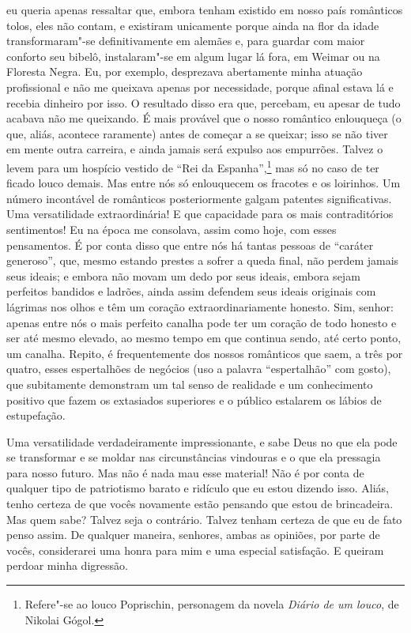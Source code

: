 eu queria apenas ressaltar que, embora tenham existido em nosso país românticos
tolos, eles não contam, e existiram unicamente porque ainda na flor da idade
transformaram"-se definitivamente em alemães e, para guardar com maior conforto
seu bibelô, instalaram"-se em algum lugar lá fora, em Weimar ou na Floresta
Negra. Eu, por exemplo, desprezava abertamente minha atuação profissional e não
me queixava apenas por necessidade, porque afinal estava lá e recebia dinheiro
por isso. O resultado disso era que, percebam, eu apesar de tudo acabava não me
queixando. É mais provável que o nosso romântico enlouqueça (o que, aliás,
acontece raramente) antes de começar a se queixar; isso se não tiver em mente
outra carreira, e ainda jamais será expulso aos empurrões. Talvez o levem para
um hospício vestido de “Rei da Espanha”,\footnote{ Refere"-se ao louco
Poprischin, personagem da novela \textit{Diário de um louco}, de Nikolai
Gógol.} mas só no caso de ter ficado louco demais. Mas entre nós só enlouquecem
os fracotes e os loirinhos. Um número incontável de românticos posteriormente
galgam patentes significativas. Uma versatilidade extraordinária! E que
capacidade para os mais contraditórios sentimentos! Eu na época me consolava,
assim como hoje, com esses pensamentos. É por conta disso que entre nós há
tantas pessoas de “caráter generoso”, que, mesmo estando prestes a sofrer a
queda final, não perdem jamais seus ideais; e embora não movam um dedo por seus
ideais, embora sejam perfeitos bandidos e ladrões, ainda assim defendem seus
ideais originais com lágrimas nos olhos e têm um coração extraordinariamente
honesto. Sim, senhor: apenas entre nós o mais perfeito canalha pode ter um
coração de todo honesto e ser até mesmo elevado, ao mesmo tempo em que continua
sendo, até certo ponto, um canalha. Repito, é frequentemente dos nossos
românticos que saem, a três por quatro, esses espertalhões de negócios (uso a
palavra “espertalhão” com gosto), que subitamente demonstram um tal senso de
realidade e um conhecimento positivo que fazem os extasiados superiores e o
público estalarem os lábios de estupefação.

Uma versatilidade verdadeiramente impressionante, e sabe Deus no que ela
pode se transformar e se moldar nas circunstâncias vindouras e o que
ela pressagia para nosso futuro. Mas não é nada mau esse material! Não
é por conta de qualquer tipo de patriotismo barato e ridículo que eu
estou dizendo isso. Aliás, tenho certeza de que vocês novamente estão
pensando que estou de brincadeira. Mas quem sabe? Talvez seja o
contrário. Talvez tenham certeza de que eu de fato penso assim. De
qualquer maneira, senhores, ambas as opiniões, por parte de vocês,
considerarei uma honra para mim e uma especial satisfação. E queiram
perdoar minha digressão.

